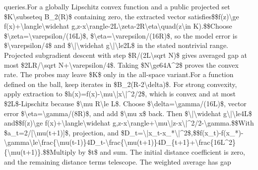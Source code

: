 \documentclass[10pt,a4paper]{article}
\begin{document}
queries.\newline{}\newline{}For a globally Lipschitz convex function and a public projected set \$K\textbackslash{}subseteq B\_\allowbreak{}2(R)\$ containing zero,\allowbreak{} the extracted vector satisfies\newline{}\$\$f(z)\textbackslash{}ge f(x)+\textbackslash{}langle\textbackslash{}widehat g,\allowbreak{}z-x\textbackslash{}rangle-2L\textbackslash{}zeta-2R\textbackslash{}eta\textbackslash{}quad(z\textbackslash{}in K).\$\$\newline{}Choose \$\textbackslash{}zeta=\allowbreak{}\textbackslash{}varepsilon/\allowbreak{}(16L)\$,\allowbreak{} \$\textbackslash{}eta=\allowbreak{}\textbackslash{}varepsilon/\allowbreak{}(16R)\$,\allowbreak{} so the model error is \$\textbackslash{}varepsilon/\allowbreak{}4\$ and \$\textbackslash{}|\textbackslash{}widehat g\textbackslash{}|\textbackslash{}le2L\$ in the stated nontrivial range. Projected subgradient descent with step \$R/\allowbreak{}(2L\textbackslash{}sqrt N)\$ gives averaged gap at most \$2LR/\allowbreak{}\textbackslash{}sqrt N+\textbackslash{}varepsilon/\allowbreak{}4\$. Taking \$N\textbackslash{}ge64A\textasciicircum{}2\$ proves the convex rate. The probes may leave \$K\$ only in the all-space variant.\newline{}\newline{}For a function defined on the ball,\allowbreak{} keep iterates in \$B\_\allowbreak{}2(R-2\textbackslash{}delta)\$. For strong convexity,\allowbreak{} apply extraction to \$h(x)=\allowbreak{}f(x)-\textbackslash{}mu\textbackslash{}|x\textbackslash{}|\textasciicircum{}2/\allowbreak{}2\$,\allowbreak{} which is convex and at most \$2L\$-Lipschitz because \$\textbackslash{}mu R\textbackslash{}le L\$. Choose \$\textbackslash{}delta=\allowbreak{}\textbackslash{}gamma/\allowbreak{}(16L)\$,\allowbreak{} vector error \$\textbackslash{}eta=\allowbreak{}\textbackslash{}gamma/\allowbreak{}(8R)\$,\allowbreak{} and add \$\textbackslash{}mu x\$ back. Then \$\textbackslash{}|\textbackslash{}widehat g\textbackslash{}|\textbackslash{}le4L\$ and\newline{}\$\$f(z)\textbackslash{}ge f(x)+\textbackslash{}langle\textbackslash{}widehat g,\allowbreak{}z-x\textbackslash{}rangle+\textbackslash{}mu\textbackslash{}|z-x\textbackslash{}|\textasciicircum{}2/\allowbreak{}2-\textbackslash{}gamma.\$\$\newline{}With \$a\_\allowbreak{}t=\allowbreak{}2/\allowbreak{}[\textbackslash{}mu(t+1)]\$,\allowbreak{} projection,\allowbreak{} and \$D\_\allowbreak{}t=\allowbreak{}\textbackslash{}|x\_\allowbreak{}t-x\_\allowbreak{}*\textbackslash{}|\textasciicircum{}2\$,\allowbreak{}\newline{}\$\$f(x\_\allowbreak{}t)-f(x\_\allowbreak{}*)-\textbackslash{}gamma\textbackslash{}le\textbackslash{}frac\{\textbackslash{}mu(t-1)\}4D\_\allowbreak{}t-\textbackslash{}frac\{\textbackslash{}mu(t+1)\}4D\_\allowbreak{}\{t+1\}+\textbackslash{}frac\{16L\textasciicircum{}2\}\{\textbackslash{}mu(t+1)\}.\$\$\newline{}Multiply by \$t\$ and sum. The initial distance coefficient is zero,\allowbreak{} and the remaining distance terms telescope. The weighted average has gap 
\end{document}
